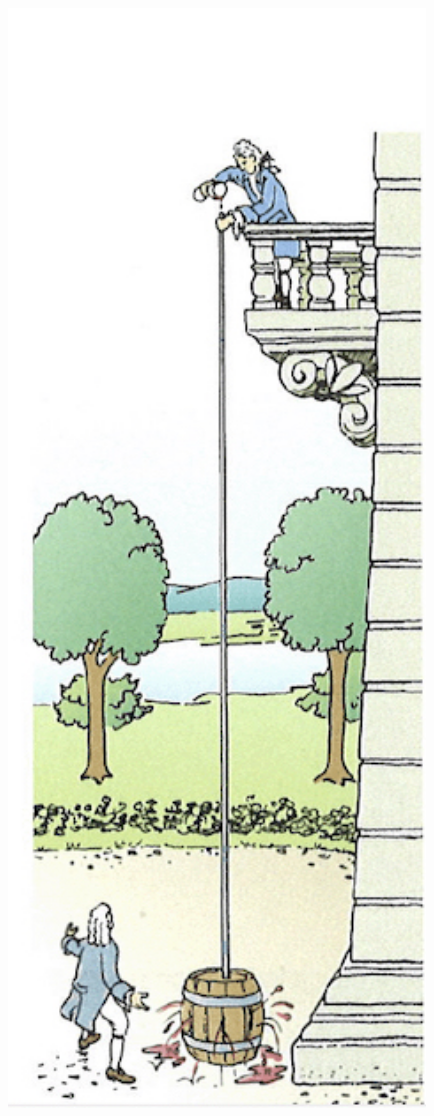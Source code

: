 \documentclass[11pt]{article}
\begin{document}
\begin{minipage}{0.28\textwidth}
    \begin{flushright}
        \includegraphics[width=0.9\textwidth]{images/Pascal.jpg}
    \end{flushright}
\end{minipage}
\end{document}

